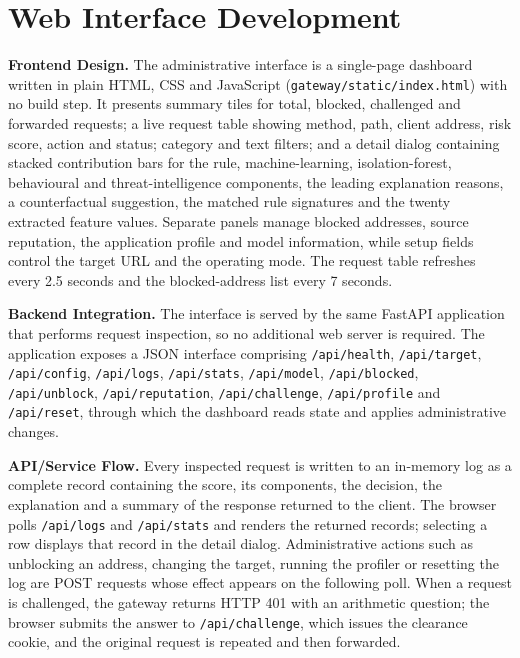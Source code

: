 \section{Web Interface Development}

\textbf{Frontend Design.} The administrative interface is a single-page dashboard written in plain HTML, CSS and JavaScript (\texttt{gateway/static/index.html}) with no build step. It presents summary tiles for total, blocked, challenged and forwarded requests; a live request table showing method, path, client address, risk score, action and status; category and text filters; and a detail dialog containing stacked contribution bars for the rule, machine-learning, isolation-forest, behavioural and threat-intelligence components, the leading explanation reasons, a counterfactual suggestion, the matched rule signatures and the twenty extracted feature values. Separate panels manage blocked addresses, source reputation, the application profile and model information, while setup fields control the target URL and the operating mode. The request table refreshes every 2.5 seconds and the blocked-address list every 7 seconds.

\textbf{Backend Integration.} The interface is served by the same FastAPI application that performs request inspection, so no additional web server is required. The application exposes a JSON interface comprising \texttt{/api/health}, \texttt{/api/target}, \texttt{/api/config}, \texttt{/api/logs}, \texttt{/api/stats}, \texttt{/api/model}, \texttt{/api/blocked}, \texttt{/api/unblock}, \texttt{/api/reputation}, \texttt{/api/challenge}, \texttt{/api/profile} and \texttt{/api/reset}, through which the dashboard reads state and applies administrative changes.

\textbf{API/Service Flow.} Every inspected request is written to an in-memory log as a complete record containing the score, its components, the decision, the explanation and a summary of the response returned to the client. The browser polls \texttt{/api/logs} and \texttt{/api/stats} and renders the returned records; selecting a row displays that record in the detail dialog. Administrative actions such as unblocking an address, changing the target, running the profiler or resetting the log are POST requests whose effect appears on the following poll. When a request is challenged, the gateway returns HTTP 401 with an arithmetic question; the browser submits the answer to \texttt{/api/challenge}, which issues the clearance cookie, and the original request is repeated and then forwarded.


